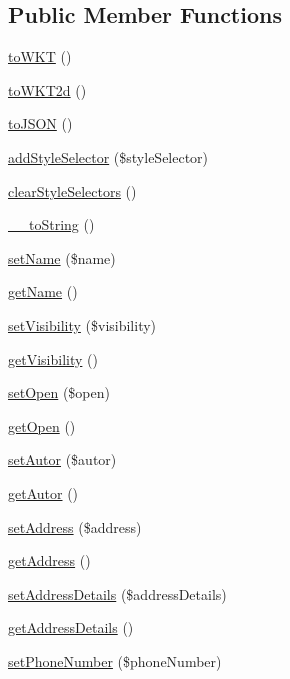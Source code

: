 \subsection*{Public Member Functions}
\begin{DoxyCompactItemize}
\item 
\hyperlink{classFeature_a8aa7faa65ae071f795a2d2b963fe795d}{toWKT} ()
\item 
\hyperlink{classFeature_a3339c1d26a4ac98fd4b92112c508fcca}{toWKT2d} ()
\item 
\hyperlink{classFeature_ada3e23a907b730daa54091f9700123c0}{toJSON} ()
\item 
\hyperlink{classFeature_a9f8bcf8a58b02fe970b80565f59dd0b4}{addStyleSelector} (\$styleSelector)
\item 
\hyperlink{classFeature_a13bde7b072baa1842dc40e45f656d968}{clearStyleSelectors} ()
\item 
\hyperlink{classFeature_a9a910474b67717a33f951f14fc8c5ba2}{\_\-\_\-toString} ()
\item 
\hyperlink{classFeature_abac51f55e0868d2a9beaa226ec01fb17}{setName} (\$name)
\item 
\hyperlink{classFeature_a26981df5dc43b19392a7be591769bbb5}{getName} ()
\item 
\hyperlink{classFeature_aad4601185c54bc3bf19659387f7fa73f}{setVisibility} (\$visibility)
\item 
\hyperlink{classFeature_a623049cd1efa09c6b5c030bd38c721b0}{getVisibility} ()
\item 
\hyperlink{classFeature_af1960ac6192ccce4e0fcb73ce7c21cc0}{setOpen} (\$open)
\item 
\hyperlink{classFeature_ad5ee05aa541a8d62f0329b1cead42f5a}{getOpen} ()
\item 
\hyperlink{classFeature_af686944d2394cbad1f402f59cfb1d4be}{setAutor} (\$autor)
\item 
\hyperlink{classFeature_a62e35e446eb29aa2ab4586ce48f09c04}{getAutor} ()
\item 
\hyperlink{classFeature_aca02429af233d54b022553112d56edab}{setAddress} (\$address)
\item 
\hyperlink{classFeature_aacc4ef608015241ffff1dacfeccc09bc}{getAddress} ()
\item 
\hyperlink{classFeature_a7eecbdf3c6896c58d2d1b9cded0cc6ef}{setAddressDetails} (\$addressDetails)
\item 
\hyperlink{classFeature_af1d451696fc5849c4a76ad583b6774c7}{getAddressDetails} ()
\item 
\hyperlink{classFeature_a25bd3bce01d5d4a5de52140bf21b6598}{setPhoneNumber} (\$phoneNumber)

\end{DoxyCompactItemize}
